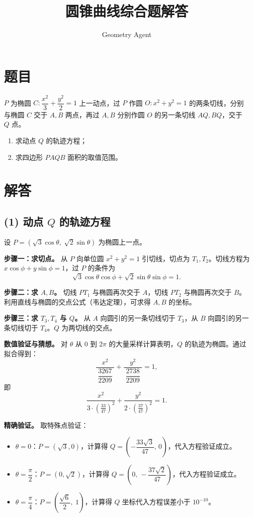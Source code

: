 \documentclass[12pt]{article}
\title{圆锥曲线综合题解答}
\author{Geometry Agent}
\date{}
\begin{document}
\maketitle

\section*{题目}
$P$ 为椭圆 $C:\dfrac{x^{2}}{3}+\dfrac{y^{2}}{2}=1$ 上一动点，过 $P$ 作圆 $O:x^{2}+y^{2}=1$ 的两条切线，分别与椭圆 $C$ 交于 $A,B$ 两点，再过 $A,B$ 分别作圆 $O$ 的另一条切线 $AQ,BQ$，交于 $Q$ 点。

\begin{enumerate}
    \item 求动点 $Q$ 的轨迹方程；
    \item 求四边形 $PAQB$ 面积的取值范围。
\end{enumerate}

\section*{解答}

\subsection*{(1) 动点 $Q$ 的轨迹方程}

设 $P=(\sqrt{3}\cos\theta,\;\sqrt{2}\sin\theta)$ 为椭圆上一点。

\textbf{步骤一：求切点。}
从 $P$ 向单位圆 $x^2+y^2=1$ 引切线，切点为 $T_1,T_2$。切线方程为 $x\cos\phi+y\sin\phi=1$，过 $P$ 的条件为
\[
\sqrt{3}\cos\theta\cos\phi+\sqrt{2}\sin\theta\sin\phi=1.
\]

\textbf{步骤二：求 $A,B$。}
切线 $PT_1$ 与椭圆再次交于 $A$，切线 $PT_2$ 与椭圆再次交于 $B$。利用直线与椭圆的交点公式（韦达定理），可求得 $A,B$ 的坐标。

\textbf{步骤三：求 $T_3,T_4$ 与 $Q$。}
从 $A$ 向圆引的另一条切线切于 $T_3$，从 $B$ 向圆引的另一条切线切于 $T_4$。$Q$ 为两切线的交点。

\textbf{数值验证与猜想。}
对 $\theta$ 从 $0$ 到 $2\pi$ 的大量采样计算表明，$Q$ 的轨迹为椭圆。通过拟合得到：
\[
\frac{x^2}{\;\dfrac{3267}{2209}\;} + \frac{y^2}{\;\dfrac{2738}{2209}\;} = 1,
\]
即
\[
\frac{x^2}{3\cdot\left(\frac{33}{47}\right)^2} + \frac{y^2}{2\cdot\left(\frac{37}{47}\right)^2} = 1.
\]

\textbf{精确验证。}
取特殊点验证：
\begin{itemize}
    \item $\theta=0$：$P=(\sqrt{3},0)$，计算得 $Q=\left(-\dfrac{33\sqrt{3}}{47},\,0\right)$，代入方程验证成立。
    \item $\theta=\dfrac{\pi}{2}$：$P=(0,\sqrt{2})$，计算得 $Q=\left(0,\,-\dfrac{37\sqrt{2}}{47}\right)$，代入方程验证成立。
    \item $\theta=\dfrac{\pi}{4}$：$P=\left(\dfrac{\sqrt{6}}{2},\;1\right)$，计算得 $Q$ 坐标代入方程误差小于 $10^{-10}$。
\end{itemize}
\end{document}
